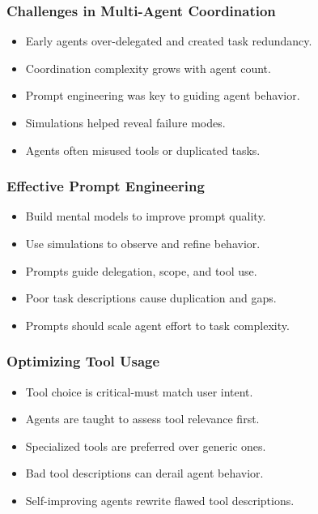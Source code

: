 \begin{frame}[fragile]\frametitle{Challenges in Multi-Agent Coordination}
    \begin{itemize}
        \item Early agents over-delegated and created task redundancy.
        \item Coordination complexity grows with agent count.
        \item Prompt engineering was key to guiding agent behavior.
        \item Simulations helped reveal failure modes.
        \item Agents often misused tools or duplicated tasks.
    \end{itemize}
\end{frame}

\begin{frame}[fragile]\frametitle{Effective Prompt Engineering}
    \begin{itemize}
        \item Build mental models to improve prompt quality.
        \item Use simulations to observe and refine behavior.
        \item Prompts guide delegation, scope, and tool use.
        \item Poor task descriptions cause duplication and gaps.
        \item Prompts should scale agent effort to task complexity.
    \end{itemize}
\end{frame}

\begin{frame}[fragile]\frametitle{Optimizing Tool Usage}
    \begin{itemize}
        \item Tool choice is critical-must match user intent.
        \item Agents are taught to assess tool relevance first.
        \item Specialized tools are preferred over generic ones.
        \item Bad tool descriptions can derail agent behavior.
        \item Self-improving agents rewrite flawed tool descriptions.
    \end{itemize}
\end{frame}

